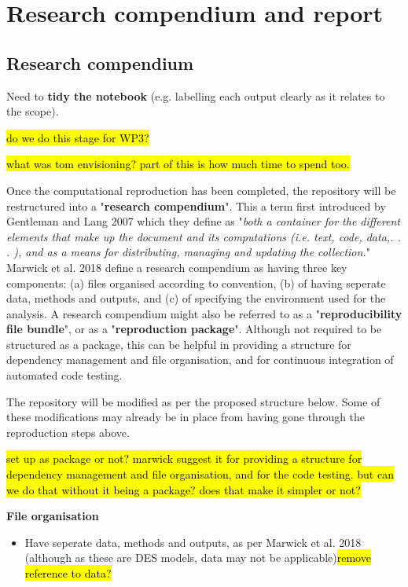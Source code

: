 \section{Research compendium and report}

\subsection{Research compendium} \label{sec:compendium}

Need to \textbf{tidy the notebook} (e.g. labelling each output clearly as it relates to the scope).

\hl{do we do this stage for WP3?}

\hl{what was tom envisioning? part of this is how much time to spend too.}

Once the computational reproduction has been completed, the repository will be restructured into a "\textbf{research compendium}". This a term first introduced by Gentleman and Lang 2007\autocite{gentleman_statistical_2007} which they define as "\textit{both a container for the different elements that make up the document and its computations (i.e. text, code, data,. . . ), and as a means for distributing, managing and updating the collection.}"\autocite{gentleman_statistical_2007} Marwick et al. 2018 define a research compendium as having three key components: (a) files organised according to convention, (b) of having seperate data, methods and outputs, and (c) of specifying the environment used for the analysis.\autocite{marwick_packaging_2018} A research compendium might also be referred to as a "\textbf{reproducibility file bundle}",\autocite{arguillas_10_2022} or as a "\textbf{reproduction package}".\autocite{krafczyk_learning_2021} Although not required to be structured as a package, this can be helpful in providing a structure for dependency management and file organisation, and for continuous integration of automated code testing.\autocite{marwick_packaging_2018}

The repository will be modified as per the proposed structure below. Some of these modifications may already be in place from having gone through the reproduction steps above.

\hl{set up as package or not? marwick suggest it for providing a structure for dependency management and file organisation, and for the code testing. but can we do that without it being a package? does that make it simpler or not?}

\textbf{File organisation}
\begin{itemize}
    \item Have seperate data, methods and outputs, as per Marwick et al. 2018\autocite{marwick_packaging_2018} (although as these are DES models, data may not be applicable)\hl{remove reference to data?}
\end{itemize}

